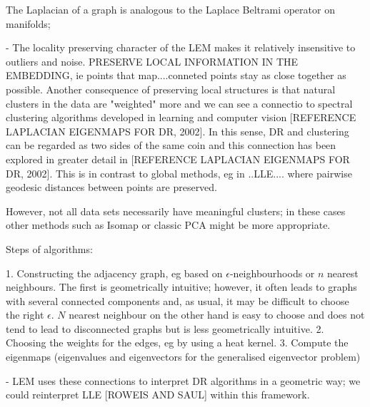 \documentclass[journal, a4paper]{IEEEtran}
\begin{document}
The Laplacian of a graph is analogous to the Laplace Beltrami operator on manifolds; 

- The locality preserving character of the LEM makes it relatively insensitive to outliers and noise. 
PRESERVE LOCAL INFORMATION IN THE EMBEDDING, ie points that map....conneted points stay as close together as possible.
Another consequence of preserving local structures  is that natural clusters in the data are "weighted" more and we can see a connectio to spectral clustering algorithms developed in learning and computer vision [REFERENCE LAPLACIAN EIGENMAPS FOR DR, 2002].
In this sense, DR and clustering can be regarded as two sides of the same coin and this connection has been explored in greater detail in [REFERENCE LAPLACIAN EIGENMAPS FOR DR, 2002]. 
This is in contrast to global methods, eg in ..LLE.... where pairwise geodesic distances between points are preserved.


However, not all data sets necessarily have meaningful clusters; in these cases other methods such as Isomap or classic PCA might be more appropriate. 

Steps of algorithms:

1. Constructing the adjacency graph, eg based on \( \epsilon \)-neighbourhoods or \( n \) nearest neighbours.
The first is geometrically intuitive; however, it often leads to graphs with several connected components and, as usual, it may be difficult to choose the right \( \epsilon \). \( N \) nearest neighbour on the other hand is easy to choose and does not tend to lead to disconnected graphs but is less geometrically intuitive.
2. Choosing the weights for the edges, eg by using a heat kernel.
3. Compute the eigenmaps (eigenvalues and eigenvectors for the generalised eigenvector problem)

- LEM uses these connections to interpret DR algorithms in a geometric way; we could reinterpret LLE [ROWEIS AND SAUL] within this framework. 



\end{document}
